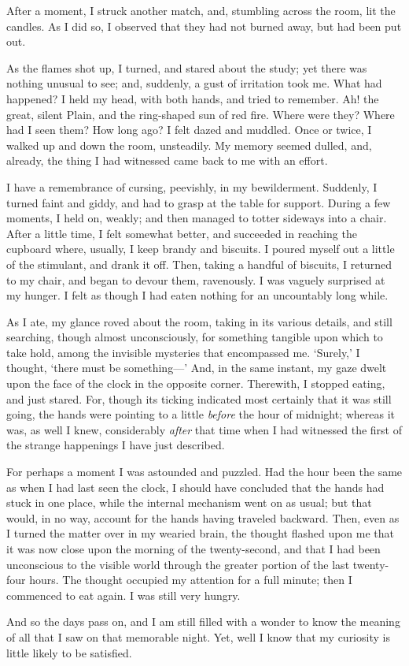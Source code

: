 After a moment, I struck another match, and, stumbling across the room, lit the candles. As I did so, I observed that they had not burned away, but had been put out.

As the flames shot up, I turned, and stared about the study; yet there was nothing unusual to see; and, suddenly, a gust of irritation took me. What had happened? I held my head, with both hands, and tried to remember. Ah! the great, silent Plain, and the ring-shaped sun of red fire. Where were they? Where had I seen them? How long ago? I felt dazed and muddled. Once or twice, I walked up and down the room, unsteadily. My memory seemed dulled, and, already, the thing I had witnessed came back to me with an effort.

I have a remembrance of cursing, peevishly, in my bewilderment. Suddenly, I turned faint and giddy, and had to grasp at the table for support. During a few moments, I held on, weakly; and then managed to totter sideways into a chair. After a little time, I felt somewhat better, and succeeded in reaching the cupboard where, usually, I keep brandy and biscuits. I poured myself out a little of the stimulant, and drank it off. Then, taking a handful of biscuits, I returned to my chair, and began to devour them, ravenously. I was vaguely surprised at my hunger. I felt as though I had eaten nothing for an uncountably long while.

As I ate, my glance roved about the room, taking in its various details, and still searching, though almost unconsciously, for something tangible upon which to take hold, among the invisible mysteries that encompassed me. ‘Surely,’ I thought, ‘there must be something---’ And, in the same instant, my gaze dwelt upon the face of the clock in the opposite corner. Therewith, I stopped eating, and just stared. For, though its ticking indicated most certainly that it was still going, the hands were pointing to a little \textit{before} the hour of midnight; whereas it was, as well I knew, considerably \textit{after} that time when I had witnessed the first of the strange happenings I have just described.

For perhaps a moment I was astounded and puzzled. Had the hour been the same as when I had last seen the clock, I should have concluded that the hands had stuck in one place, while the internal mechanism went on as usual; but that would, in no way, account for the hands having traveled backward. Then, even as I turned the matter over in my wearied brain, the thought flashed upon me that it was now close upon the morning of the twenty-second, and that I had been unconscious to the visible world through the greater portion of the last twenty-four hours. The thought occupied my attention for a full minute; then I commenced to eat again. I was still very hungry.

And so the days pass on, and I am still filled with a wonder to know the meaning of all that I saw on that memorable night. Yet, well I know that my curiosity is little likely to be satisfied.

\clearpage
